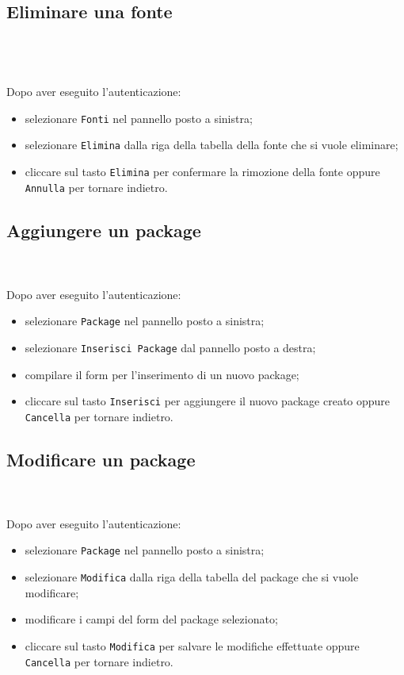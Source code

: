 	\subsection{Eliminare una fonte} \mbox{}\\ \mbox{}\\\\
	Dopo aver eseguito l'autenticazione:
	\begin{itemize}
		\item selezionare \texttt{Fonti} nel pannello posto a sinistra;
		\item selezionare \texttt{Elimina} dalla riga della tabella della fonte 
		che si vuole eliminare;\
		\item cliccare sul tasto \texttt{Elimina} per confermare la rimozione 
		della fonte
		oppure \texttt{Annulla} per tornare indietro.
	\end{itemize}
	
	\subsection{Aggiungere un package} \mbox{}\\ \mbox{}\\
	Dopo aver eseguito l'autenticazione:
	\begin{itemize}
		\item selezionare \texttt{Package} nel pannello posto a sinistra;
		\item selezionare \texttt{Inserisci Package} dal pannello posto a 
		destra;
		\item compilare il form per l'inserimento di un nuovo package;
		\item cliccare sul tasto \texttt{Inserisci} per aggiungere il nuovo 
		package
		creato oppure \texttt{Cancella} per tornare indietro.	
	\end{itemize}
	
	\subsection{Modificare un package} \mbox{}\\ \mbox{}\\
	Dopo aver eseguito l'autenticazione:
	\begin{itemize}
		\item selezionare \texttt{Package} nel pannello posto a sinistra;
		\item selezionare \texttt{Modifica} dalla riga della tabella del package
		che si vuole modificare;
		\item modificare i campi del form del package selezionato;
		\item cliccare sul tasto \texttt{Modifica} per salvare le modifiche 
		effettuate
		oppure \texttt{Cancella} per tornare indietro.
	\end{itemize}
	

